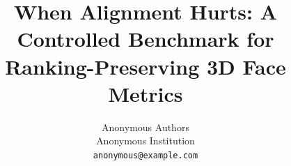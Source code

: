 \documentclass[10pt,twocolumn,letterpaper]{article}
\title{When Alignment Hurts: A Controlled Benchmark for Ranking-Preserving 3D Face Metrics}
\author{%
  Anonymous Authors \\
  Anonymous Institution \\
  \texttt{anonymous@example.com}
}
\begin{document}
\maketitle

\begin{abstract}

\end{abstract}
\end{document}
